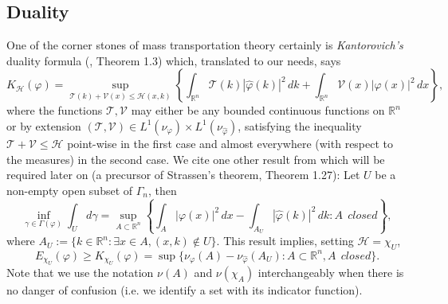 \documentclass[12pt,a4paper]{article}
\newcommand{\RR}[1]{\mathbb{R}^#1}
\newcommand{\HH}{\mathcal{H}}
\newcommand{\TT}{\mathcal{T}}
\newcommand{\VV}{\mathcal{V}}
\begin{document}
\subsection{Duality}
One of the corner stones of mass transportation theory certainly is 
{\sl Kantorovich's} duality formula (\cite{villani_topics_2003}, Theorem 1.3)
which, translated to our needs, says
\begin{equation}\label{duality}
   K_\HH(\varphi) = \sup_{\TT(k)+\VV(x) \leq \HH(x,k)} 
              \left\{ \int_{\RR n} \TT(k) |\hat\varphi(k)|^2 \,dk +
                               \int_{\RR n} \VV(x) |\varphi(x)|^2 \,dx                         
                                      \right\},
\end{equation}
where the functions $\TT,\VV$ may either be any bounded continuous functions on $\RR n$
or by extension $(\TT,\VV)\in L^1(\nu_{\varphi})\times L^1(\nu_{\hat\varphi})$,
satisfying the inequality $\TT+\VV\leq \HH$ point-wise in the first case and almost
everywhere (with respect to the measures) in the second case. 
We cite one other result from \cite{villani_topics_2003} which will be required
later on (a precursor of Strassen's theorem, Theorem 1.27): 
Let $U$ be a non-empty open subset of $\Gamma_n$, then
\begin{equation}\label{Strassen}
     \inf_{\gamma\in\Gamma(\varphi)} \int_{U} d\gamma =
       \sup_{A\subset{\RR n}} 
          \left\{ 
            \int_{A} |\varphi(x)|^2\,dx -
            \int_{A_U} |\hat\varphi(k)|^2\, dk : A\,\; closed 
          \right\},                                                 
\end{equation}
where $A_U:=\{k\in{\RR n}: \exists x\in A , (x,k)\notin U \}$. This result
implies, setting $\HH=\chi_U$,
\begin{displaymath}
  E_{\chi_U}(\varphi)\geq K_{\chi_U}(\varphi)=
        \sup\{ \nu_{\varphi}(A)-\nu_{\hat\varphi}(A_U)
            : A\subset{\RR n},A\,\;closed \}. 
\end{displaymath}
Note that we use the notation $\nu(A)$ and $\nu(\chi_A)$ interchangeably when
there is no danger of confusion (i.e. we identify a set with its indicator 
function).
%
\end{document}
